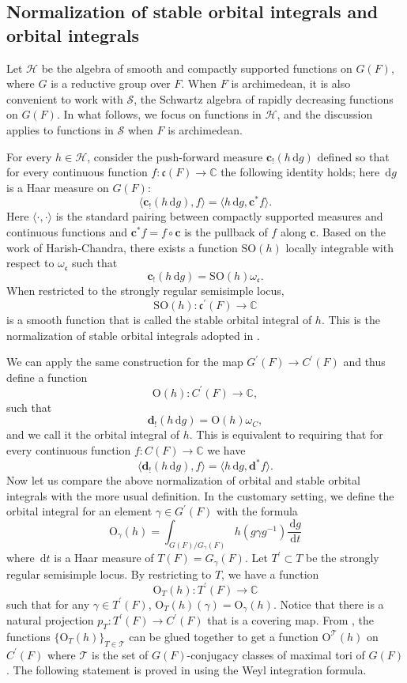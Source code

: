 \documentclass[iccmp]{ipbook}
\newcommand{\BC}{{\mathbb {C}}}
\newcommand{\CH}{{\mathcal {H}}}
\newcommand{\CS}{{\mathcal {S}}}
\newcommand{\CT}{{\mathcal {T}}}
\newcommand{\Fc}{{\mathfrak {c}}}
\newcommand{\RO}{{\mathrm {O}}}
\newcommand{\RS}{{\mathrm {S}}}
\newcommand{\ud}{\,\mathrm{d}}
\def\ome{{\omega}}
\def\gam{{\gamma}}
\def\p{\prime}
\def\bc{\mathbf{c}}
\begin{document}
\subsection{Normalization of stable orbital integrals and orbital integrals}\label{subsec:normalizationSOI-OI}

Let $\CH$ be the algebra of smooth and compactly supported functions on $G(F)$, where $G$ is a reductive group over $F$. When $F$ is archimedean, it is also convenient to work with $\CS$, the Schwartz algebra of rapidly decreasing functions on $G(F)$. In what follows, we focus on functions in $\CH$, and the discussion applies to functions in $\CS$ when $F$ is archimedean.

For every $h\in \CH$, consider the push-forward measure $\bc_!(h\ud g)$ defined so that for every continuous function $f:\Fc(F)\to \BC$ the following identity holds; here $\ud g$ is a Haar measure on $G(F)$:
$$
\langle \bc_!(h\ud g),f\rangle = \langle h\ud g,\bc^*f\rangle.
$$
Here $\langle \cdot,\cdot \rangle$ is the standard pairing between compactly supported measures and continuous functions and $\bc^*f = f\circ \bc$ is the pullback of $f$ along $\bc$. Based on the work of Harish-Chandra, there exists a function $\RS\RO(h)$ locally integrable with respect to $\ome_\Fc$ such that
$$
\bc_!(h\ud g) = \RS\RO(h)\ome_\Fc.
$$
When restricted to the strongly regular semisimple locus, 
$$
\RS\RO(h):\Fc^\p(F)\to \BC
$$
is a smooth function that is called the stable orbital integral of $h$. This is the normalization of stable orbital integrals adopted in \cite[(3.31)]{FLN10}.

We can apply the same construction for the map $G^\p(F)\to C^\p(F)$ and thus define a function 
$$
\RO(h):C^\p(F)\to \BC,
$$
such that 
$$
\mathbf{d}_!(h\ud g) = \RO(h)\ome_C,
$$
and we call it the orbital integral of $h$. This is equivalent to requiring that for every continuous function $f:C(F)\to \BC$ we have 
$$
\langle 
\mathbf{d}_!(h\ud g),f\rangle = 
\langle h\ud g,\mathbf{d}^*f\rangle.
$$
Now let us compare the above normalization of orbital and stable orbital integrals with the more usual definition. In the customary setting, we define the orbital integral for an element $\gam\in G^\p(F)$ with the formula 
\begin{equation}\label{eq:normalize-SOI:1}
\RO_\gam(h) = 
\int_{G(F)/G_\gam(F)}
h(g\gam g^{-1})\frac{\ud g}{\ud t}
\end{equation}
where $\ud t$ is a Haar measure of $T(F) = G_\gam(F)$. Let $T^\p\subset T$ be the strongly regular semisimple locus. By restricting to $T$, we have a function
\begin{equation}\label{eq:normalize-SOI:2}
\RO_T(h):T^\p(F)\to \BC
\end{equation}
such that for any $\gam\in T^\p(F)$, $\RO_T(h)(\gam) = \RO_\gam(h)$. Notice that there is a natural projection $p_T:T^\p(F)\to C^\p(F)$ that is a covering map. From \cite[\S 3.2]{LN}, the functions $\{\RO_T(h)\}_{T\in \CT}$ can be glued together to get a function $\RO^\CT(h)$ on $C^\p(F)$ where $\CT$ is the set of $G(F)$-conjugacy classes of maximal tori of $G(F)$. The following statement is proved in \cite[Cor.~3.2.2]{LN} using the Weyl integration formula.
\end{document}

